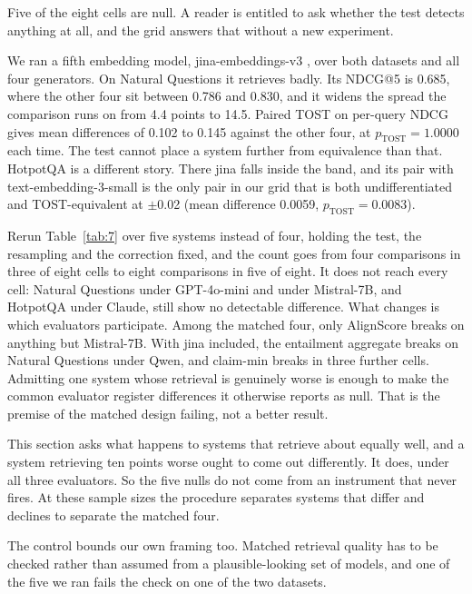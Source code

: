 \label{sec:control}

Five of the eight cells are null. A reader is entitled to ask whether the test detects anything at all, and the grid answers that without a new experiment.

We ran a fifth embedding model, jina-embeddings-v3 \citep{sturua-etal-2024}, over both datasets and all four generators. On Natural Questions it retrieves badly. Its NDCG@5 is 0.685, where the other four sit between 0.786 and 0.830, and it widens the spread the comparison runs on from 4.4 points to 14.5. Paired TOST on per-query NDCG gives mean differences of 0.102 to 0.145 against the other four, at $p_{\mathrm{TOST}} = 1.0000$ each time. The test cannot place a system further from equivalence than that. HotpotQA is a different story. There jina falls inside the band, and its pair with text-embedding-3-small is the only pair in our grid that is both undifferentiated and TOST-equivalent at $\pm$0.02 (mean difference 0.0059, $p_{\mathrm{TOST}} = 0.0083$).

Rerun Table~\ref{tab:7} over five systems instead of four, holding the test, the resampling and the correction fixed, and the count goes from four comparisons in three of eight cells to eight comparisons in five of eight. It does not reach every cell: Natural Questions under GPT-4o-mini and under Mistral-7B, and HotpotQA under Claude, still show no detectable difference. What changes is which evaluators participate. Among the matched four, only AlignScore breaks on anything but Mistral-7B. With jina included, the entailment aggregate breaks on Natural Questions under Qwen, and claim-min breaks in three further cells. Admitting one system whose retrieval is genuinely worse is enough to make the common evaluator register differences it otherwise reports as null. That is the premise of the matched design failing, not a better result.

This section asks what happens to systems that retrieve about equally well, and a system retrieving ten points worse ought to come out differently. It does, under all three evaluators. So the five nulls do not come from an instrument that never fires. At these sample sizes the procedure separates systems that differ and declines to separate the matched four.

The control bounds our own framing too. Matched retrieval quality has to be checked rather than assumed from a plausible-looking set of models, and one of the five we ran fails the check on one of the two datasets.
